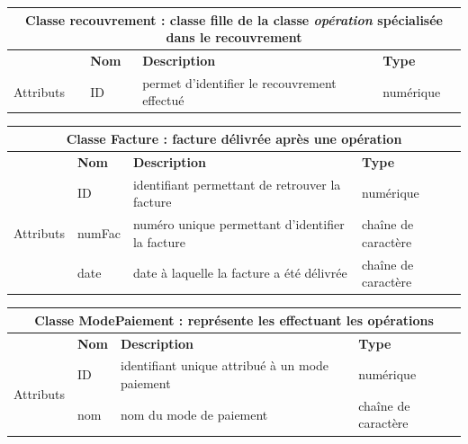 		
		\begin{tabular}{|l|l|l|l|}
			\hline
			\multicolumn{4}{|c|}{\textbf{Classe recouvrement : classe fille de la classe \textit{opération} spécialisée dans le recouvrement}} \\
			
			\hline
			
			& \textbf{Nom} & \textbf{Description} & \textbf{Type} \\
			\multirow{1}{*}{Attributs} & ID & permet d'identifier le recouvrement effectué & numérique \\
			\hline
			
		\end{tabular}
		\label{table16}
		
		\begin{tabular}{|l|l|l|l|}
			\hline
			\multicolumn{4}{|c|}{\textbf{Classe Facture : facture délivrée après une opération}} \\
			\hline
			
			& \textbf{Nom} & \textbf{Description} & \textbf{Type} \\
			\multirow{3}{*}{Attributs} & ID & identifiant permettant de retrouver la facture & numérique \\
			
			& numFac & numéro unique permettant d'identifier la facture &  chaîne de caractère \\
			
			& date & date à laquelle la facture a été délivrée & chaîne de caractère \\
			
			\hline
			
		\end{tabular}
		\label{table8}
		
		
		\begin{tabular}{|l|l|l|l|}
			\hline
			\multicolumn{4}{|c|}{\textbf{Classe ModePaiement : représente les effectuant les opérations}} \\
			
			\hline
			
			& \textbf{Nom} & \textbf{Description} & \textbf{Type} \\
			\multirow{3}{*}{Attributs} & ID & identifiant unique attribué à un mode paiement  & numérique \\
			
			& nom & nom du mode de paiement &  chaîne de caractère \\
			
			\hline
			
		\end{tabular}
		\label{table9}
		
